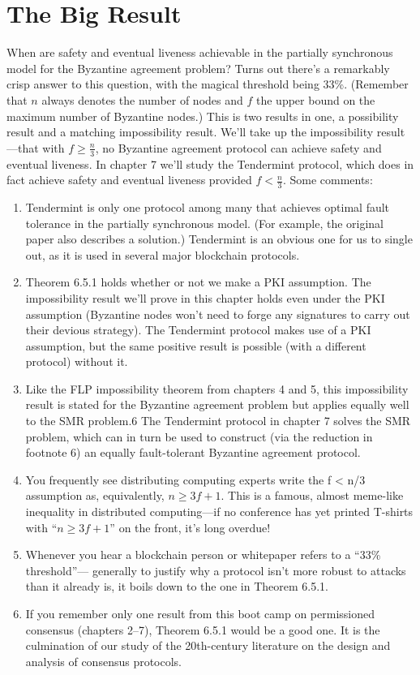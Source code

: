 \section{The Big Result}
When are safety and eventual liveness achievable in the partially synchronous model for the Byzantine agreement problem? Turns out there’s a remarkably crisp answer to this
question, with the magical threshold being 33\%. (Remember that $n$ always denotes the
number of nodes and $f$ the upper bound on the maximum number of Byzantine nodes.)
This is two results in one, a possibility result and a matching impossibility result.
We’ll take up the impossibility result—that with $f \geq \frac{n}{3}$, no Byzantine agreement protocol
can achieve safety and eventual liveness. In chapter 7 we’ll study the Tendermint protocol,
which does in fact achieve safety and eventual liveness provided $f < \frac{n}{3}$. Some comments:
\begin{enumerate}
    \item Tendermint is only one protocol among many that achieves optimal fault tolerance in
the partially synchronous model. (For example, the original paper also describes a
solution.) Tendermint is an obvious one for us to single out, as it is used in several major blockchain protocols.
    \item Theorem 6.5.1 holds whether or not we make a PKI assumption. The impossibility
result we’ll prove in this chapter holds even under the PKI assumption (Byzantine
nodes won’t need to forge any signatures to carry out their devious strategy). The
Tendermint protocol makes use of a PKI assumption, but the same positive result is
possible (with a different protocol) without it.
    \item Like the FLP impossibility theorem from chapters 4 and 5, this impossibility result
is stated for the Byzantine agreement problem but applies equally well to the SMR problem.6 The Tendermint protocol in chapter 7 solves the SMR problem, which can
in turn be used to construct (via the reduction in footnote 6) an equally fault-tolerant
Byzantine agreement protocol.
    \item You frequently see distributing computing experts write the f < n/3 assumption as,
equivalently, $n \geq 3f + 1$. This is a famous, almost meme-like inequality in distributed
computing—if no conference has yet printed T-shirts with “$n \geq 3f + 1$” on the front,
it’s long overdue!
    \item Whenever you hear a blockchain person or whitepaper refers to a “33\% threshold”—
generally to justify why a protocol isn’t more robust to attacks than it already is, it
boils down to the one in Theorem 6.5.1.
    \item If you remember only one result from this boot camp on permissioned consensus (chapters 2–7), Theorem 6.5.1 would be a good one. It is the culmination of our study of the 20th-century literature on the design and analysis of consensus protocols.
\end{enumerate}

